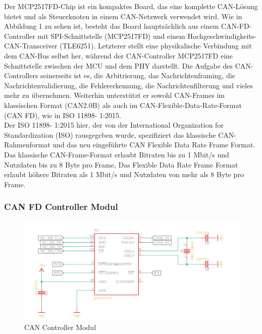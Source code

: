 Der MCP2517FD-Chip ist ein kompaktes Board, das eine komplette CAN-Lösung bietet und als Steuerknoten in einem CAN-Netzwerk verwendet wird. Wie in Abbildung 1 zu sehen ist, besteht das Board hauptsächlich aus einem CAN-FD-Controller mit SPI-Schnittstelle (MCP2517FD) und einem Hochgeschwindigkeits-CAN-Transceiver (TLE6251). Letzterer stellt eine physikalische Verbindung mit dem CAN-Bus selbst her, während der CAN-Controller MCP2517FD eine Schnittstelle zwischen der MCU und dem PHY darstellt. Die Aufgabe des CAN-Controllers seinerseits ist es, die Arbitrierung, das Nachrichtenframing, die Nachrichtenvalidierung, die Fehlererkennung, die Nachrichtenfilterung und vieles mehr zu übernehmen. Weiterhin unterstützt er sowohl CAN-Frames im klassischen Format (CAN2.0B) als auch im CAN-Flexible-Data-Rate-Format (CAN FD), wie in ISO 11898- 1:2015.\\
Der ISO 11898- 1:2015 hier, der von der International Organization for Standardization (ISO) rausgegeben wurde, spezifiziert das klassische CAN-Rahmenformat und das neu eingeführte CAN Flexible Data Rate Frame Format. Das klassische CAN-Frame-Format erlaubt Bitraten bis zu 1 Mbit/s und Nutzdaten bis zu 8 Byte pro Frame, Das Flexible Data Rate Frame Format erlaubt höhere Bitraten als 1 Mbit/s und Nutzdaten von mehr als 8 Byte pro Frame.

\subsubsection{CAN FD Controller Modul}

\begin{figure}[h]
	\begin{center}
		\includegraphics[width=1\textwidth]{./images/mcp_eagle.jpg}
	\end{center}
	\vspace{-5pt}
	\caption[CAN Controller Modul]{CAN Controller Modul} %
	\label{fig:can:controller}
	\vspace{-5pt}
\end{figure}

